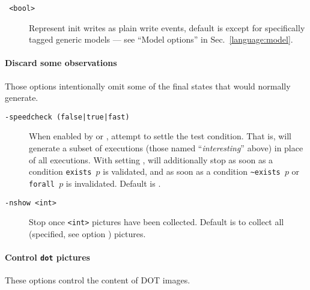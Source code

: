 \begin{description}
\item[{\tt {} <bool>}]
Represent init writes as plain write events, default is  except
for specifically tagged generic models --- see ``Model options''
in Sec.~\ref{language:model}.


\end{description}

\paragraph*{Discard some observations}
Those options intentionally omit some of the final states that \herd{} would
normally generate.

\begin{description}
\item[{\tt -speedcheck (false|true|fast)}] 
When enabled by 
or , attempt to settle the test condition.
That is, \herd{} will
generate a subset of executions (those named ``\emph{interesting}'' above)
in place of all executions.
With setting ,
\herd{} will additionally stop as soon as a condition \verb+exists +$p$ is validated, and as soon as a condition \verb+~exists +$p$ or
\verb+forall +$p$ is invalidated. Default is .

\item[{\tt -nshow <int>}]
Stop once \verb+<int>+ pictures have been collected. Default is to
collect all (specified, see option ) pictures.
\end{description}

\paragraph*{Control \texttt{dot} pictures}
These options control the content of DOT images.

